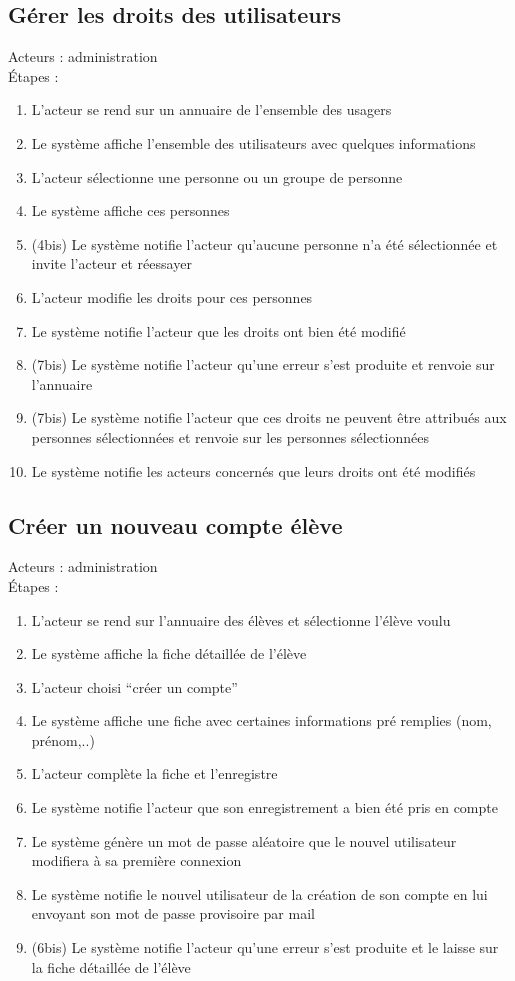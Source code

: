 \documentclass{scrreprt}
\begin{document}
 
\subsection{Gérer les droits des utilisateurs}
Acteurs : administration
\\
\'Etapes :
\begin{enumerate}
\item L’acteur se rend sur un annuaire de l’ensemble des usagers
\item Le système affiche l’ensemble des utilisateurs avec quelques informations
\item L’acteur sélectionne une personne ou un groupe de personne
\item Le système affiche ces personnes
\item (4bis) Le système notifie l’acteur qu’aucune personne n’a été sélectionnée et invite l’acteur et réessayer
\item L’acteur modifie les droits pour ces personnes
\item Le système notifie l’acteur que les droits ont bien été modifié
\item (7bis) Le système notifie l’acteur qu’une erreur s’est produite et renvoie sur l’annuaire
\item (7bis) Le système notifie l’acteur que ces droits ne peuvent être attribués aux personnes sélectionnées et renvoie sur les personnes sélectionnées
\item Le système notifie les acteurs concernés que leurs droits ont été modifiés
\end{enumerate}




 
\subsection{Créer un nouveau compte élève}
Acteurs : administration
\\
\'Etapes :
\begin{enumerate}
\item L’acteur se rend sur l’annuaire des élèves et sélectionne l’élève voulu
\item Le système affiche la fiche détaillée de l’élève
\item L’acteur choisi “créer un compte”
\item Le système affiche une fiche avec certaines informations pré remplies (nom, prénom,..)
\item L’acteur complète la fiche et l’enregistre 
\item Le système notifie l’acteur que son enregistrement a bien été pris en compte
\item Le système génère un mot de passe aléatoire que le nouvel utilisateur modifiera à sa première connexion
\item Le système notifie le nouvel utilisateur de la création de son compte en lui envoyant son mot de passe provisoire par mail
\item (6bis) Le système notifie l’acteur qu’une erreur s’est produite et le laisse sur la fiche détaillée de l’élève
\end{enumerate}
\end{document}
